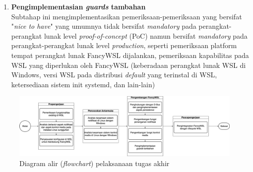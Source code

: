 \begin{enumerate}
\begin{enumerate}
        \item \textbf{Pengimplementasian \textit{guards} tambahan}\\
        Subtahap ini mengimplementasikan pemeriksaan-pemeriksaan yang bersifat "\textit{nice to have}" yang umumnya tidak bersifat \textit{mandatory} pada perangkat-perangkat lunak level \textit{proof-of-concept} (PoC) namun bersifat \textit{mandatory} pada perangkat-perangkat lunak level \textit{production}, seperti pemeriksaan platform tempat perangkat lunak FancyWSL dijalankan, pemeriksaan kapabilitas pada WSL yang diperlukan oleh FancyWSL (keberadaan perangkat lunak WSL di Windows, versi WSL pada distribusi \textit{default} yang terinstal di WSL, ketersediaan sistem init systemd, dan lain-lain)
    \end{enumerate}
\end{enumerate}

\begin{figure}
    \centering
    \includegraphics[width=1\linewidth]{assets/alur-pengerjaan-v1.png}
    \caption{Diagram alir (\textit{flowchart}) pelaksanaan tugas akhir}
    \label{diagram-alir-pelaksanaan}
\end{figure}

